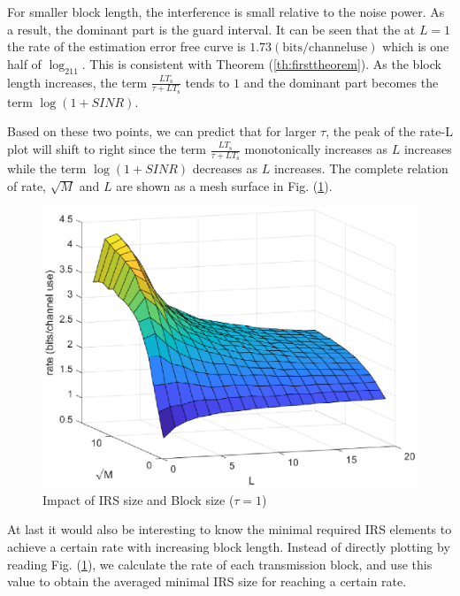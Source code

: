 \documentclass[12pt,draftclsnofoot,onecolumn,journal]{IEEEtran}
\begin{document}
 For smaller block length, the interference is small relative to the noise power. As a result, the dominant part is the guard interval. It can be seen that the at $L=1$ the rate of the estimation error free curve is $1.73 (\mathrm{bits/channel use})$ which is one half of $\log_211$. This is consistent with Theorem (\ref{th:firsttheorem}). As the block length increases, the term $\frac{LT_{\mathrm{s}}}{\tau+LT_{\mathrm{s}}}$ tends to $1$ and the dominant part becomes the term $\log(1+SINR)$. 

Based on these two points, we can predict that for larger $\tau$, the peak of the rate-L plot will shift to right since the term $\frac{LT_{\mathrm{s}}}{\tau+LT_{\mathrm{s}}}$ monotonically increases as $L$ increases while the term $\log(1+SINR)$ decreases as $L$ increases. The complete relation of rate, $\sqrt M$ and $L$ are shown as a mesh surface in Fig. (\ref{fig:fullrelation3d}).
\begin{figure}[htbp]
 \includegraphics[width=6in]{threed.eps}
  \caption{Impact of IRS size and Block size ($\tau=1$)}
  \label{fig:fullrelation3d}
\end{figure}

At last it would also be interesting to know the minimal required IRS elements to achieve a certain rate with increasing block length. Instead of directly plotting by reading Fig. (\ref{fig:fullrelation3d}), we calculate the rate of each transmission block, and use this value to obtain the averaged minimal IRS size for reaching a certain rate. 
\end{document}
